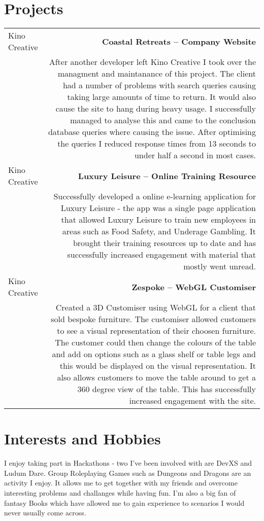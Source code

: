\documentclass[10pt]{article}
\begin{document}
\section*{Projects}
\begin{tabular}{L!{\VRule}R}
Kino Creative&{\bf Coastal Retreats -- Company Website}\\
&After another developer left Kino Creative I took over the managment and maintanance of this project. The client had a number of problems with search queries causing taking large amounts of time to return. It would also cause the site to hang during heavy usage. I successfully managed to analyse this and came to the conclusion database queries where causing the issue. After optimising the queries I reduced response times from 13 seconds to under half a second in most cases.\\
Kino Creative&{\bf Luxury Leisure -- Online Training Resource}\\
&Successfully developed a online e-learning application for Luxury Leisure - the app was a single page application that allowed Luxury Leisure to train new employees in areas such as Food Safety, and Underage Gambling. It brought their training resources up to date and has successfully increased engagement with material that mostly went unread.\\
Kino Creative&{\bf Zespoke -- WebGL Customiser}\\
&Created a 3D Customiser using WebGL for a client that sold bespoke furniture. The customiser allowed customers to see a visual representation of their choosen furniture. The customer could then change the colours of the table and add on options such as a glass shelf or table legs and this would be displayed on the visual representation. It also allows customers to move the table around to get a 360 degree view of the table. This has successfully increased engagement with the site.\\
\end{tabular}

\section*{Interests and Hobbies}
I enjoy taking part in Hackathons - two I've been involved with are DevXS and Ludum Dare. Group Roleplaying Games such as Dungeons and Dragons are an activity I enjoy. It allows me to get together with my friends and overcome interesting problems and challanges while having fun. I'm also a big fan of fantasy Books which have allowed me to gain experience to scenarios I would never usually come across.
\end{document}
